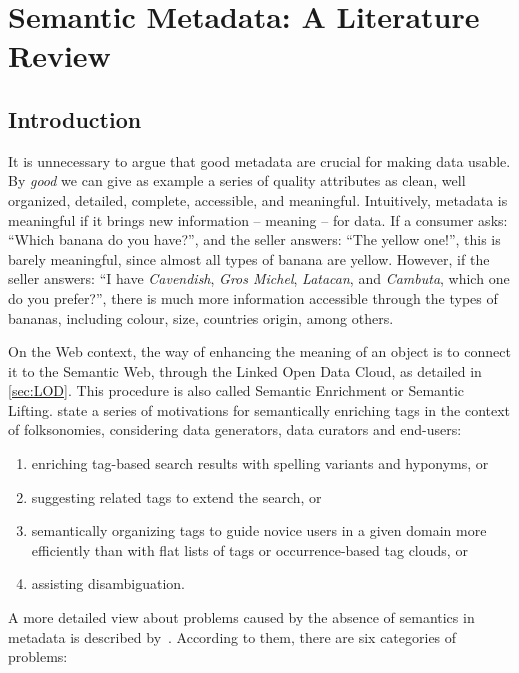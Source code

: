 \section{Semantic Metadata: A Literature Review}
\label{sec:semantic_metadata}

\subsection{Introduction}

It is unnecessary to argue that good metadata are crucial for making data usable.
By \emph{good} we can give as example a series of quality attributes as clean, well organized, detailed, complete, accessible, and meaningful.
Intuitively, metadata is meaningful if it brings new information -- meaning -- for data.
If a consumer asks: ``Which banana do you have?'', and the seller answers: ``The yellow one!'', this is barely meaningful, since almost all types of banana are yellow.
However, if the seller answers: ``I have \emph{Cavendish}, \emph{Gros Michel}, \emph{Latacan}, and \emph{Cambuta}, which one do you prefer?'', there is much more information accessible through the types of bananas, including colour, size, countries origin, among others.

On the Web context, the way of enhancing the meaning of an object is to connect it to the Semantic Web, through the Linked Open Data Cloud, as detailed in \autoref{sec:LOD}.
This procedure is also called Semantic Enrichment or Semantic Lifting.
 state a series of motivations for semantically enriching tags in the context of folksonomies, considering data generators, data curators and end-users:
\begin{enumerate}
	\item enriching tag-based search results with spelling variants and hyponyms, or 
	\item suggesting related tags to extend the search, or 
	\item semantically organizing tags to guide novice users in a given domain more efficiently than with flat lists of tags or occurrence-based tag clouds, or 
	\item assisting disambiguation.
\end{enumerate}

A more detailed view about problems caused by the absence of semantics in metadata is described by~.
According to them, there are six categories of problems:

